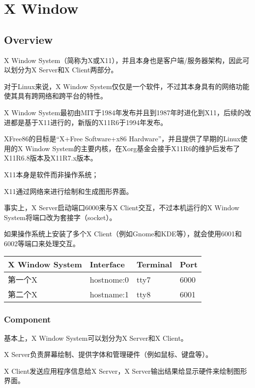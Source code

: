 \part{X Window}


\chapter{Overview}

X Window System（简称为X或X11），并且本身也是客户端/服务器架构，因此可以划分为X Server和X Client两部分。

对于Linux来说，X Window System仅仅是一个软件，不过其本身具有的网络功能使其具有跨网络和跨平台的特性。

X Window System最初由MIT于1984年发布并且到1987年时进化到X11，后续的改进都是基于X11进行的，新版的X11R6于1994年发布。

XFree86的目标是“X+Free Software+x86 Hardware”，并且提供了早期的Linux使用的X Window System的主要内核，在Xorg基金会接手X11R6的维护后发布了X11R6.8版本及X11R7.x版本。

\begin{compactitem}
\item X11本身是软件而非操作系统；
\item X11通过网络来进行绘制和生成图形界面。
\end{compactitem}

事实上，X Server启动端口6000来与X Client交互，不过本机运行的X Window System将端口改为套接字（socket）。

如果操作系统上安装了多个X Client（例如Gnome和KDE等），就会使用6001和6002等端口来处理交互。

\begin{table}[htbp]
\centering
\begin{tabular}{|l|l|l|l|}
\hline
X Window System & Interface & Terminal & Port \\
\hline
第一个X & hostnome:0 & tty7 & 6000\\
\hline
第二个X & hostname:1 & tty8 & 6001\\
\hline
\end{tabular}
\end{table}



\section{Component}


基本上，X Window System可以划分为X Server和X Client。

\begin{compactitem}
\item X Server负责屏幕绘制、提供字体和管理硬件（例如鼠标、键盘等）。
\item X Client发送应用程序信息给X Server，X Server输出结果给显示硬件来绘制图形界面。
\end{compactitem}


